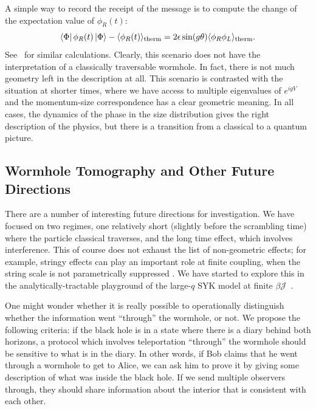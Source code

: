 \documentclass[aps,pra,reprint,floatfix,superscriptaddress, nofootinbib,longbibliography,onecolumn,notitlepage,12pt, tightenlines]{revtex4-1}
\begin{document}
A simple way to record the receipt of the message is to compute the change of the expectation value of $\phi_R(t)$: %
\begin{equation}
\bra \Phi \phi_R(t)\ket \Phi - \langle \phi_R(t)\rangle_\textrm{therm} =  2\epsilon \sin (g \theta)\langle\phi_R\phi_L\rangle_\textrm{therm}.
\end{equation}
See~\cite{gao2018regenesis,maldacena2017diving} for similar calculations.
Clearly, this scenario does not have the interpretation of a classically traversable wormhole. In fact, there is not much geometry left in the description at all. This scenario is contrasted with the situation at shorter times, where we have access to multiple eigenvalues of $e^{igV}$ and the momentum-size correspondence has a clear geometric meaning. In all cases, the dynamics of the phase in the size distribution gives the right description of the physics, but there is a transition from a classical to a quantum picture.



\subsection{Wormhole Tomography and Other Future Directions}
There are a number of interesting future directions for investigation. We have focused on two regimes, one relatively short (slightly before the scrambling time) where the particle classical traverses, and the long time effect, which involves interference. This of course does not exhaust the list of non-geometric effects; for example, stringy effects can play an important role at finite coupling, when the string scale is not parametrically suppressed \cite{maldacena2017diving}. We have started to explore this in the analytically-tractable playground of the large-$q$ SYK model at finite $\beta \mathcal{J}$~\cite{longpaper}.

One might wonder whether it is really possible to operationally distinguish whether the information went ``through'' the wormhole, or not. We propose the following criteria: if the black hole is in a state where there is a diary behind both horizons, a protocol which involves teleportation ``through'' the wormhole should be sensitive to what is in the diary. In other words, if Bob claims that he went through a wormhole to get to Alice, we can ask him to prove it by giving some description of what was inside the black hole. If we send multiple observers through, they should share information about the interior that is consistent with each other. 
\end{document}
